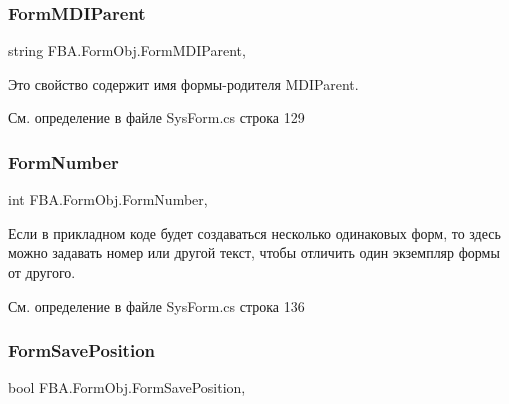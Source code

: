 \subsubsection{\texorpdfstring{Form\+M\+D\+I\+Parent}{FormMDIParent}}
{\footnotesize\ttfamily string F\+B\+A.\+Form\+Obj.\+Form\+M\+D\+I\+Parent\hspace{0.3cm}{\ttfamily [get]}, {\ttfamily [set]}}



Это свойство содержит имя формы-\/родителя M\+D\+I\+Parent. 



См. определение в файле Sys\+Form.\+cs строка 129

\mbox{\label{class_f_b_a_1_1_form_obj_a0925f190c3b1fded776c7da00811f5ea}} 
\subsubsection{\texorpdfstring{Form\+Number}{FormNumber}}
{\footnotesize\ttfamily int F\+B\+A.\+Form\+Obj.\+Form\+Number\hspace{0.3cm}{\ttfamily [get]}, {\ttfamily [set]}}



Если в прикладном коде будет создаваться несколько одинаковых форм, то здесь можно задавать номер или другой текст, чтобы отличить один экземпляр формы от другого. 



См. определение в файле Sys\+Form.\+cs строка 136

\mbox{\label{class_f_b_a_1_1_form_obj_aee28e366247372fbac9d3c1a0df330c1}} 
\subsubsection{\texorpdfstring{Form\+Save\+Position}{FormSavePosition}}
{\footnotesize\ttfamily bool F\+B\+A.\+Form\+Obj.\+Form\+Save\+Position\hspace{0.3cm}{\ttfamily [get]}, {\ttfamily [set]}}



